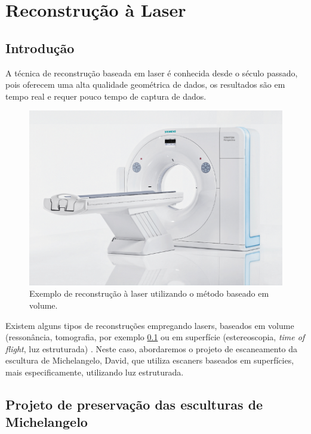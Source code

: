 \chapter*{Reconstrução à Laser}\label{sec:laser}

\section{Introdução}

A técnica de reconstrução baseada em laser é conhecida desde o século passado, pois oferecem uma alta qualidade geométrica de dados, os resultados são em tempo real e requer pouco tempo de captura de dados. 

\begin{figure}[!h]
	\centering
	\includegraphics[width=1\linewidth]{figs/tomografia.png}
	\caption{%
	Exemplo de reconstrução à laser utilizando o método baseado em volume.
	}\label{fig:laservolume}
\end{figure}

Existem alguns tipos de reconstruções empregando lasers, baseados em volume (ressonância, tomografia, por exemplo \ref{fig:laservolume} ou em superfície (estereoscopia, {\it time of flight}, luz estruturada) . Neste caso, abordaremos o projeto de escaneamento da escultura de Michelangelo, David, que utiliza escaners baseados em superfícies, mais especificamente, utilizando luz estruturada.

\section{Projeto de preservação das esculturas de Michelangelo}

